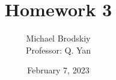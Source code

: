 


\title{Homework 3}
\date{February 7, 2023}
\author{Michael Brodskiy\\ \small Professor: Q. Yan}



\maketitle

\newpage

